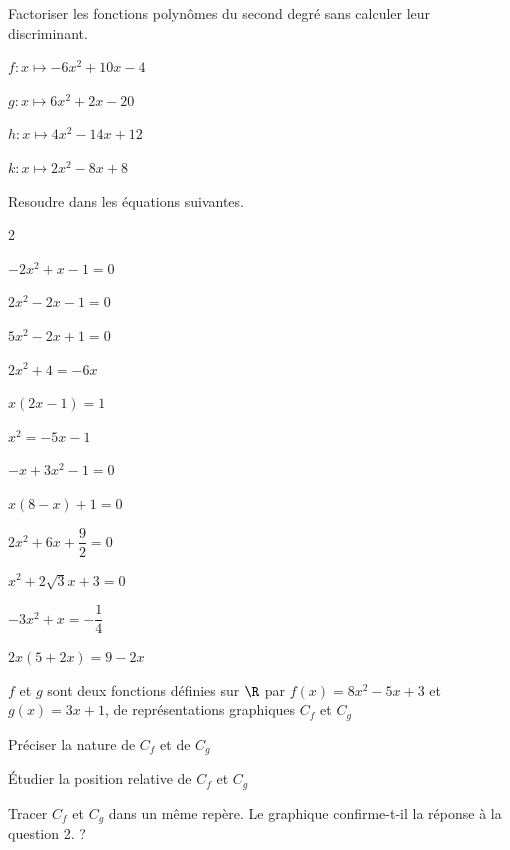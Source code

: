 \documentclass[11pt,a4paper]{article}  %
\begin{document}
	\graphicspath{{images/}}
	
	\begin{center}
		
		
	\end{center}

Factoriser les fonctions polynômes du second degré sans calculer leur discriminant.
\begin{enumMet}
	\item $f: x \mapsto-6 x^2+10 x-4$
	\item $g: x \mapsto 6 x^2+2 x-20$
	\item $h: x \mapsto 4 x^2-14 x+12$
	\item $k: x \mapsto 2 x^2-8 x+8$
\end{enumMet}

Resoudre dans \R les équations suivantes.
\begin{multicols}{2}
\begin{enumMet}
	\item $-2 x^2+x-1=0$
	\item $2 x^2-2 x-1=0$
	\item $5 x^2-2 x+1=0$
	\item $2 x^2+4=-6 x$
	\item $x(2 x-1)=1$
	\item $x^2=-5 x-1$
	\item $-x+3 x^2-1=0$
	\item $x(8-x)+1=0$
	\item $2 x^2+6 x+\dfrac{9}{2}=0$
	\item $x^2+2 \sqrt{3} x+3=0$
	\item $-3 x^2+x=-\dfrac{1}{4}$
	\item $2 x(5+2 x)=9-2 x$
\end{enumMet}
\end{multicols}


$f$ et $g$ sont deux fonctions définies sur $\R$ par $f(x)=8 x^2-5 x+3$ et $g(x)=3 x+1$, de représentations graphiques $C_f$ et $C_g$
\begin{enumMet}
	\item Préciser la nature de $C_f$ et de $C_g$
	\item Étudier la position relative de $C_f$ et $C_g$
	\item Tracer $C_f$ et $C_g$ dans un même repère. Le graphique confirme-t-il la réponse à la question 2. ?
\end{enumMet}
\end{document}
